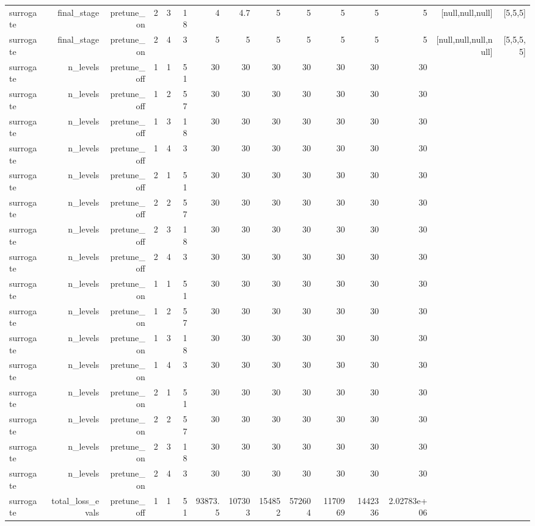 \begin{table}[htbp]
\begin{tabular}{lrrrrrrrrrrrrrr}
surrogate & final\_stage & pretune\_on & 2 & 3 & 18 & 4 & 4.7 & 5 & 5 & 5 & 5 & 5 & [null,null,null] & [5,5,5] \\
surrogate & final\_stage & pretune\_on & 2 & 4 & 3 & 5 & 5 & 5 & 5 & 5 & 5 & 5 & [null,null,null,null] & [5,5,5,5] \\
surrogate & n\_levels & pretune\_off & 1 & 1 & 51 & 30 & 30 & 30 & 30 & 30 & 30 & 30 &  &  \\
surrogate & n\_levels & pretune\_off & 1 & 2 & 57 & 30 & 30 & 30 & 30 & 30 & 30 & 30 &  &  \\
surrogate & n\_levels & pretune\_off & 1 & 3 & 18 & 30 & 30 & 30 & 30 & 30 & 30 & 30 &  &  \\
surrogate & n\_levels & pretune\_off & 1 & 4 & 3 & 30 & 30 & 30 & 30 & 30 & 30 & 30 &  &  \\
surrogate & n\_levels & pretune\_off & 2 & 1 & 51 & 30 & 30 & 30 & 30 & 30 & 30 & 30 &  &  \\
surrogate & n\_levels & pretune\_off & 2 & 2 & 57 & 30 & 30 & 30 & 30 & 30 & 30 & 30 &  &  \\
surrogate & n\_levels & pretune\_off & 2 & 3 & 18 & 30 & 30 & 30 & 30 & 30 & 30 & 30 &  &  \\
surrogate & n\_levels & pretune\_off & 2 & 4 & 3 & 30 & 30 & 30 & 30 & 30 & 30 & 30 &  &  \\
surrogate & n\_levels & pretune\_on & 1 & 1 & 51 & 30 & 30 & 30 & 30 & 30 & 30 & 30 &  &  \\
surrogate & n\_levels & pretune\_on & 1 & 2 & 57 & 30 & 30 & 30 & 30 & 30 & 30 & 30 &  &  \\
surrogate & n\_levels & pretune\_on & 1 & 3 & 18 & 30 & 30 & 30 & 30 & 30 & 30 & 30 &  &  \\
surrogate & n\_levels & pretune\_on & 1 & 4 & 3 & 30 & 30 & 30 & 30 & 30 & 30 & 30 &  &  \\
surrogate & n\_levels & pretune\_on & 2 & 1 & 51 & 30 & 30 & 30 & 30 & 30 & 30 & 30 &  &  \\
surrogate & n\_levels & pretune\_on & 2 & 2 & 57 & 30 & 30 & 30 & 30 & 30 & 30 & 30 &  &  \\
surrogate & n\_levels & pretune\_on & 2 & 3 & 18 & 30 & 30 & 30 & 30 & 30 & 30 & 30 &  &  \\
surrogate & n\_levels & pretune\_on & 2 & 4 & 3 & 30 & 30 & 30 & 30 & 30 & 30 & 30 &  &  \\
surrogate & total\_loss\_evals & pretune\_off & 1 & 1 & 51 & 93873.5 & 107303 & 154852 & 572604 & 1170969 & 1442336 & 2.02783e+06 &  &  \\

\end{tabular}
\end{table}
